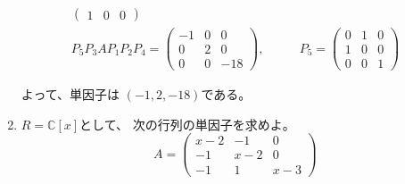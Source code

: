 \documentclass[12pt,b5paper]{ltjsarticle}
\begin{document}
\begin{enumerate}
\begin{align}
\begin{pmatrix}
         1 & 0 & 0
        \end{pmatrix}
       \\
       P_{5} P_{3} A P_{1} P_{2} P_{4}=
        \begin{pmatrix}
         -1 & 0 & 0 \\
         0 & 2 & 0 \\
         0 & 0 & -18
        \end{pmatrix},
        &\qquad
        P_{5} =
        \begin{pmatrix}
         0 & 1 & 0 \\
         1 & 0 & 0 \\
         0 & 0 & 1
        \end{pmatrix}
      \end{align}

      よって、単因子は
      $(-1,2,-18)$である。

      \hrulefill

 \item
      $R=\mathbb{C}[x]$として、
      次の行列の単因子を求めよ。
      \begin{equation}
       A=
        \begin{pmatrix}
         x-2 & -1 & 0 \\
         -1 & x-2 & 0 \\
         -1 & 1 & x-3
        \end{pmatrix}
      \end{equation}

      \dotfill



\end{enumerate}
\end{document}
